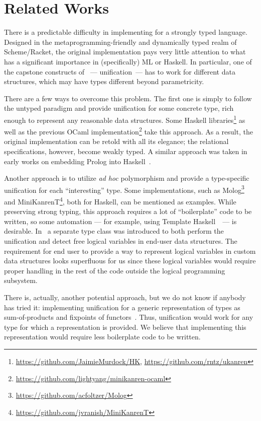 \section{Related Works}
\label{sec:relworks}

There is a predictable difficulty in implementing \miniKanren for a strongly typed language.
Designed in the metaprogramming-friendly and dynamically typed realm of Scheme/Racket, the original
\miniKanren implementation pays very little attention to what has a significant importance in (specifically)
ML or Haskell. In particular, one of the capstone constructs of \miniKanren~--- unification~--- has to work for
different data structures, which may have types different beyond parametricity.

There are a few ways to overcome this problem. The first one is simply to follow the untyped paradigm and
provide unification for some concrete type, rich enough to represent any reasonable data structures.
Some Haskell \miniKanren libraries\footnote{\url{https://github.com/JaimieMurdock/HK}, \url{https://github.com/rntz/ukanren}}
as well as the previous OCaml implementation\footnote{\url{https://github.com/lightyang/minikanren-ocaml}} take this approach.
As a result, the original implementation can be retold with all its elegance; the relational specifications, however,
become weakly typed. A similar approach was taken in early works on embedding Prolog into Haskell~\cite{PrologInHaskell}.

Another approach is to utilize \emph{ad hoc} polymorphism and provide a type-specific unification for each ``interesting'' type.
Some \miniKanren implementations, such as Molog\footnote{\url{https://github.com/acfoltzer/Molog}} and
MiniKanrenT\footnote{\url{https://github.com/jvranish/MiniKanrenT}}, both for Haskell, can be mentioned as examples.
While preserving strong typing, this approach requires a lot of ``boilerplate''
code to be written, so some automation --- for example, using 
Template Haskell~\cite{SheardTMH}~---
is desirable. In~\cite{TypedLogicalVariables} a separate type class was introduced to both perform the unification
and detect free logical variables in end-user data structures. The requirement for end user to provide a way to represent
logical variables in custom data structures looks superfluous for us since these logical variables would require proper
handling in the rest of the code outside the logical programming subsystem.

There is, actually, another potential approach, but we do not know if anybody has tried
it: implementing unification for a generic representation of types as sum-of-products and fixpoints of
functors~\cite{InstantGenerics, ALaCarte}. Thus, unification would work for any type for which a representation
is provided. We believe that implementing this representation would require less boilerplate code to be written.

